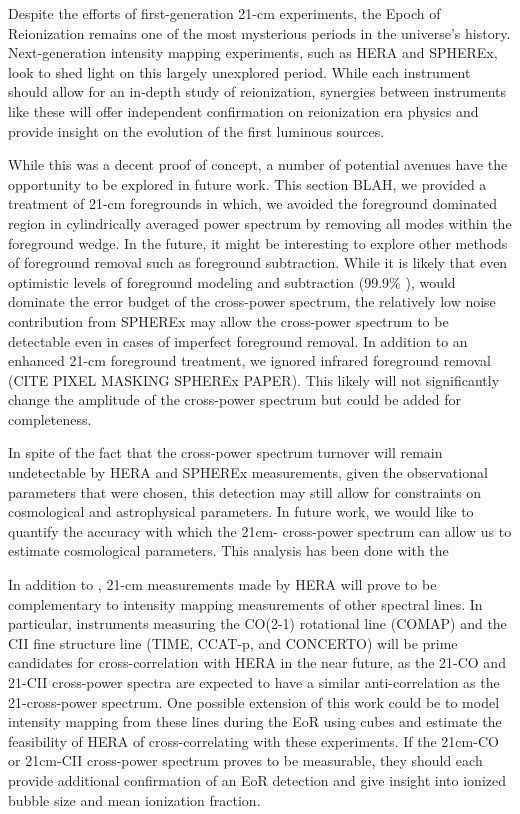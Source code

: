 Despite the efforts of first-generation 21-cm experiments, the Epoch of Reionization
remains one of the most mysterious periods in the universe's history. Next-generation
intensity mapping experiments, such as HERA and SPHEREx, look to shed light on
this largely unexplored period. While each instrument should allow for an in-depth study
of reionization, synergies between instruments like these will offer independent
confirmation on reionization era physics and provide insight on the evolution of
the first luminous sources.

While this was a decent proof of concept, a number of potential avenues have the
opportunity to be explored in future work. This section BLAH, we provided a treatment
of 21-cm foregrounds in which, we avoided the foreground dominated region in
cylindrically averaged power spectrum by removing all modes within the foreground
wedge. In the future, it might be interesting to explore other methods of foreground
removal such as foreground subtraction. While it is likely that even optimistic
levels of foreground modeling and subtraction (99.9\% \cite{2019ApJ...884....1B}), would dominate the error
budget of the cross-power spectrum, the relatively low noise contribution from SPHEREx
may allow the cross-power spectrum to be detectable even in cases of imperfect foreground
removal. In addition to an enhanced 21-cm foreground treatment, we ignored infrared foreground
removal (CITE PIXEL MASKING SPHEREx PAPER). This likely will not significantly
change the amplitude of the cross-power spectrum but could be added for completeness.

In spite of the fact that the cross-power spectrum turnover will remain undetectable
by HERA and SPHEREx measurements, given the observational parameters that were chosen, this
detection may still allow for constraints on cosmological and astrophysical parameters.
In future work, we would like to quantify the accuracy with which the 21cm-\lya
cross-power spectrum can allow us to estimate cosmological parameters. This analysis
has been done with the

In addition to \lya, 21-cm measurements made by HERA will prove to be
complementary to intensity mapping measurements of other spectral lines. In particular,
instruments measuring the CO(2-1) rotational line (COMAP) and the CII fine
structure line (TIME, CCAT-p, and CONCERTO) will be prime candidates for cross-correlation
with HERA in the near future, as the 21-CO and 21-CII cross-power spectra are expected to
have a similar anti-correlation as the 21-\lya cross-power spectrum. One possible extension of this work could be to model
intensity mapping from these lines during the EoR using \fastsim  cubes and estimate the feasibility of HERA
of cross-correlating with these experiments. If the 21cm-CO or 21cm-CII cross-power
spectrum proves to be measurable, they should each provide additional confirmation
of an EoR detection and give insight into ionized bubble size and mean ionization fraction.
